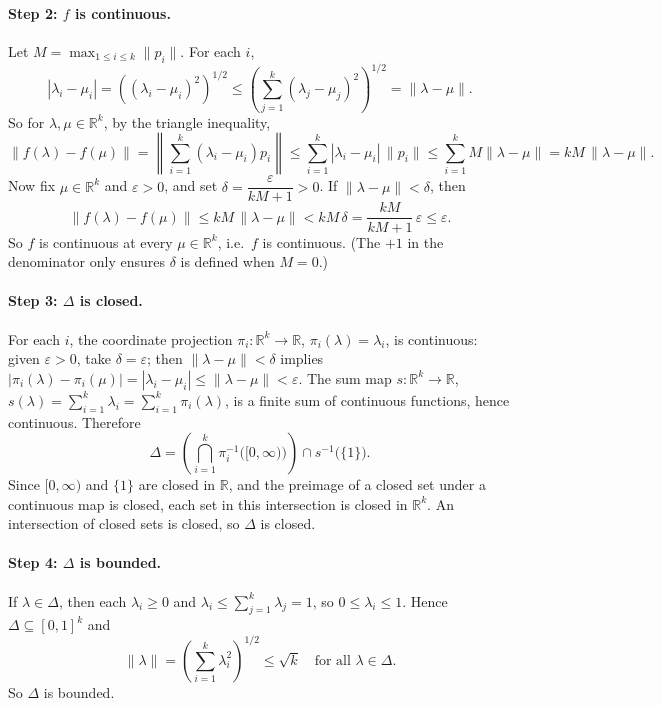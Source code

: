 \documentclass[11pt]{article}
\newcommand{\R}{\mathbb{R}}
\begin{document}
\paragraph{Step 2: $f$ is continuous.}
Let $M = \max_{1 \le i \le k} \|p_i\|$. For each $i$,
\[
  |\lambda_i - \mu_i| = \left( (\lambda_i - \mu_i)^2 \right)^{1/2}
  \le \left( \sum_{j=1}^k (\lambda_j - \mu_j)^2 \right)^{1/2} = \|\lambda - \mu\| .
\]
So for $\lambda, \mu \in \R^k$, by the triangle inequality,
\[
  \|f(\lambda) - f(\mu)\|
  = \left\| \sum_{i=1}^k (\lambda_i - \mu_i) p_i \right\|
  \le \sum_{i=1}^k |\lambda_i - \mu_i| \, \|p_i\|
  \le \sum_{i=1}^k M \|\lambda - \mu\|
  = kM\, \|\lambda - \mu\| .
\]
Now fix $\mu \in \R^k$ and $\varepsilon > 0$, and set $\delta = \dfrac{\varepsilon}{kM + 1} > 0$.
If $\|\lambda - \mu\| < \delta$, then
\[
  \|f(\lambda) - f(\mu)\| \le kM\, \|\lambda - \mu\| < kM\, \delta
  = \frac{kM}{kM + 1}\, \varepsilon \le \varepsilon .
\]
So $f$ is continuous at every $\mu \in \R^k$, i.e.\ $f$ is continuous.
(The $+1$ in the denominator only ensures $\delta$ is defined when $M = 0$.)

\paragraph{Step 3: $\Delta$ is closed.}
For each $i$, the coordinate projection $\pi_i \colon \R^k \to \R$, $\pi_i(\lambda) = \lambda_i$,
is continuous: given $\varepsilon > 0$, take $\delta = \varepsilon$; then $\|\lambda - \mu\| < \delta$
implies $|\pi_i(\lambda) - \pi_i(\mu)| = |\lambda_i - \mu_i| \le \|\lambda - \mu\| < \varepsilon$.
The sum map $s \colon \R^k \to \R$, $s(\lambda) = \sum_{i=1}^k \lambda_i = \sum_{i=1}^k \pi_i(\lambda)$,
is a finite sum of continuous functions, hence continuous. Therefore
\[
  \Delta = \left( \bigcap_{i=1}^k \pi_i^{-1}\big([0, \infty)\big) \right) \cap s^{-1}\big(\{1\}\big).
\]
Since $[0, \infty)$ and $\{1\}$ are closed in $\R$, and the preimage of a closed set under a
continuous map is closed, each set in this intersection is closed in $\R^k$. An intersection of
closed sets is closed, so $\Delta$ is closed.

\paragraph{Step 4: $\Delta$ is bounded.}
If $\lambda \in \Delta$, then each $\lambda_i \ge 0$ and $\lambda_i \le \sum_{j=1}^k \lambda_j = 1$,
so $0 \le \lambda_i \le 1$. Hence $\Delta \subseteq [0,1]^k$ and
\[
  \|\lambda\| = \left( \sum_{i=1}^k \lambda_i^2 \right)^{1/2} \le \sqrt{k} \quad \text{for all } \lambda \in \Delta .
\]
So $\Delta$ is bounded.
\end{document}
